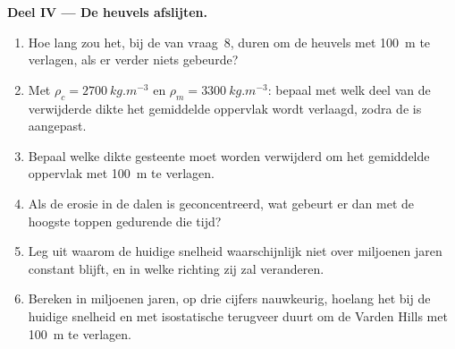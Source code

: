 \begin{problem}
\medskip
\noindent\textbf{Deel IV --- De heuvels afslijten.}
\begin{enumerate}[resume]
  \item Hoe lang zou het, bij de  van vraag~8, duren om de heuvels met \qty{100}{m} te verlagen, als er verder niets gebeurde?
  \item Met $\rho_c = \qty{2700}{kg.m^{-3}}$ en $\rho_m =
        \qty{3300}{kg.m^{-3}}$: bepaal met welk deel van de verwijderde dikte het gemiddelde oppervlak wordt verlaagd, zodra de  is aangepast.
  \item Bepaal welke dikte gesteente moet worden verwijderd om het gemiddelde oppervlak met \qty{100}{m} te verlagen.
  \item Als de erosie in de dalen is geconcentreerd, wat gebeurt er dan met de hoogste toppen gedurende die tijd?
  \item Leg uit waarom de huidige snelheid waarschijnlijk niet over miljoenen jaren constant blijft, en in welke richting zij zal veranderen.
  \item Bereken in miljoenen jaren, op drie cijfers nauwkeurig, hoelang het bij de huidige snelheid en met isostatische terugveer duurt om de Varden Hills met \qty{100}{m} te verlagen.
\end{enumerate}
\end{problem}
